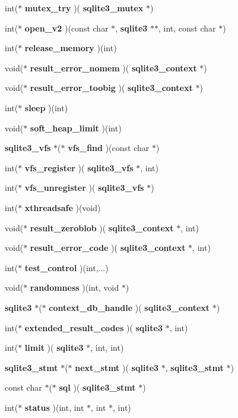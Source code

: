 \begin{DoxyCompactItemize}
\item 
int($\ast$ \textbf{ mutex\+\_\+try} )(\textbf{ sqlite3\+\_\+mutex} $\ast$)
\item 
int($\ast$ \textbf{ open\+\_\+v2} )(const char $\ast$, \textbf{ sqlite3} $\ast$$\ast$, int, const char $\ast$)
\item 
int($\ast$ \textbf{ release\+\_\+memory} )(int)
\item 
void($\ast$ \textbf{ result\+\_\+error\+\_\+nomem} )(\textbf{ sqlite3\+\_\+context} $\ast$)
\item 
void($\ast$ \textbf{ result\+\_\+error\+\_\+toobig} )(\textbf{ sqlite3\+\_\+context} $\ast$)
\item 
int($\ast$ \textbf{ sleep} )(int)
\item 
void($\ast$ \textbf{ soft\+\_\+heap\+\_\+limit} )(int)
\item 
\textbf{ sqlite3\+\_\+vfs} $\ast$($\ast$ \textbf{ vfs\+\_\+find} )(const char $\ast$)
\item 
int($\ast$ \textbf{ vfs\+\_\+register} )(\textbf{ sqlite3\+\_\+vfs} $\ast$, int)
\item 
int($\ast$ \textbf{ vfs\+\_\+unregister} )(\textbf{ sqlite3\+\_\+vfs} $\ast$)
\item 
int($\ast$ \textbf{ xthreadsafe} )(void)
\item 
void($\ast$ \textbf{ result\+\_\+zeroblob} )(\textbf{ sqlite3\+\_\+context} $\ast$, int)
\item 
void($\ast$ \textbf{ result\+\_\+error\+\_\+code} )(\textbf{ sqlite3\+\_\+context} $\ast$, int)
\item 
int($\ast$ \textbf{ test\+\_\+control} )(int,...)
\item 
void($\ast$ \textbf{ randomness} )(int, void $\ast$)
\item 
\textbf{ sqlite3} $\ast$($\ast$ \textbf{ context\+\_\+db\+\_\+handle} )(\textbf{ sqlite3\+\_\+context} $\ast$)
\item 
int($\ast$ \textbf{ extended\+\_\+result\+\_\+codes} )(\textbf{ sqlite3} $\ast$, int)
\item 
int($\ast$ \textbf{ limit} )(\textbf{ sqlite3} $\ast$, int, int)
\item 
\textbf{ sqlite3\+\_\+stmt} $\ast$($\ast$ \textbf{ next\+\_\+stmt} )(\textbf{ sqlite3} $\ast$, \textbf{ sqlite3\+\_\+stmt} $\ast$)
\item 
const char $\ast$($\ast$ \textbf{ sql} )(\textbf{ sqlite3\+\_\+stmt} $\ast$)
\item 
int($\ast$ \textbf{ status} )(int, int $\ast$, int $\ast$, int)
$$
\end{DoxyCompactItemize}
